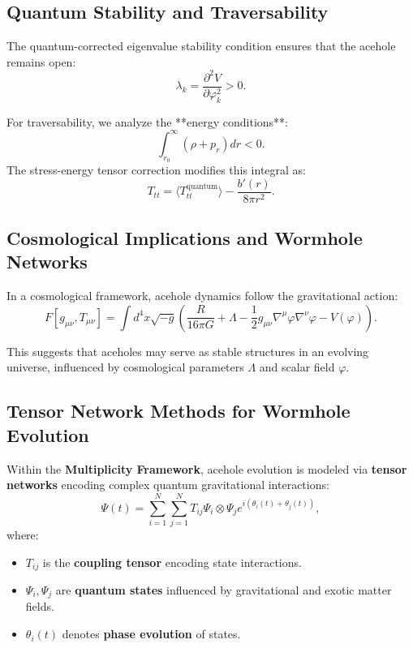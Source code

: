 \documentclass{article}
\theoremstyle{plain}
\begin{document}
\begin{itemize}
\begin{itemize}
\subsection{Quantum Stability and Traversability}

The quantum-corrected eigenvalue stability condition ensures that the acehole remains open:
\begin{equation}
\lambda_k = \frac{\partial^2 V}{\partial \varphi_k^2} > 0.
\end{equation}

For traversability, we analyze the **energy conditions**:
\begin{equation}
\int_{r_0}^{\infty} (\rho + p_r) dr < 0.
\end{equation}
The stress-energy tensor correction modifies this integral as:
\begin{equation}
T_{tt} = \langle T_{tt}^{\text{quantum}} \rangle - \frac{b'(r)}{8\pi r^2}.
\end{equation}

\subsection{Cosmological Implications and Wormhole Networks}

In a cosmological framework, acehole dynamics follow the gravitational action:
\begin{equation}
F [g_{\mu\nu}, T_{\mu\nu}] = \int d^4x \sqrt{-g} \left( \frac{R}{16\pi G} + \Lambda - \frac{1}{2} g_{\mu\nu} \nabla^\mu \varphi \nabla^\nu \varphi - V(\varphi) \right).
\end{equation}

This suggests that aceholes may serve as stable structures in an evolving universe, influenced by cosmological parameters $\Lambda$ and scalar field $\varphi$.

\subsection{Tensor Network Methods for Wormhole Evolution}
Within the \textbf{Multiplicity Framework}, acehole evolution is modeled via \textbf{tensor networks} encoding complex quantum gravitational interactions:
\begin{equation}
\Psi(t) = \sum_{i=1}^{N} \sum_{j=1}^{N} T_{ij} \Psi_i \otimes \Psi_j e^{i(\theta_i(t) + \theta_j(t))},
\end{equation}
where:
\begin{itemize}
    \item $T_{ij}$ is the \textbf{coupling tensor} encoding state interactions.
    \item $\Psi_i, \Psi_j$ are \textbf{quantum states} influenced by gravitational and exotic matter fields.
    \item $\theta_i(t)$ denotes \textbf{phase evolution} of states.
\end{itemize}


\end{itemize}
\end{itemize}
\end{document}
